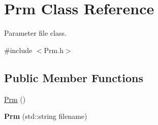 \hypertarget{classPrm}{\section{Prm Class Reference}
\label{classPrm}
}


Parameter file class.  




{\ttfamily \#include $<$Prm.\-h$>$}

\subsection*{Public Member Functions}
\begin{DoxyCompactItemize}
\item 
\hyperlink{classPrm_a260338aba1a1550ad7b29bb775254080}{Prm} ()
\item 
\hypertarget{classPrm_a5e69c3f5b55d8c1b9917eb9b3524a870}{{\bfseries Prm} (std\-::string filename)}\label{classPrm_a5e69c3f5b55d8c1b9917eb9b3524a870}


\end{DoxyCompactItemize}
